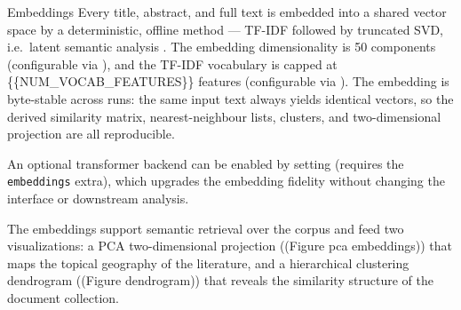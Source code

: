 \documentclass[
  ignorenonframetext,
]{beamer}
\begin{document}
\begin{frame}{Embeddings}
\label{embeddings}
Every title, abstract, and full text is embedded into a shared vector
space by a deterministic, offline method --- TF-IDF followed by
truncated SVD, i.e.~latent semantic analysis
. The embedding dimensionality is 50
components (configurable via
), and the TF-IDF
vocabulary is capped at \{\{NUM\_VOCAB\_FEATURES\}\} features
(configurable via ).
The embedding is byte-stable across runs: the same input text always
yields identical vectors, so the derived similarity matrix,
nearest-neighbour lists, clusters, and two-dimensional projection are
all reproducible.

An optional transformer backend can be enabled by setting
 (requires the
\texttt{embeddings} extra), which upgrades the embedding fidelity
without changing the interface or downstream analysis.

The embeddings support semantic retrieval over the corpus and feed two
visualizations: a PCA two-dimensional projection ((Figure pca
embeddings)) that maps the topical geography of the literature, and a
hierarchical clustering dendrogram ((Figure dendrogram)) that reveals
the similarity structure of the document collection.
\end{frame}
\end{document}
